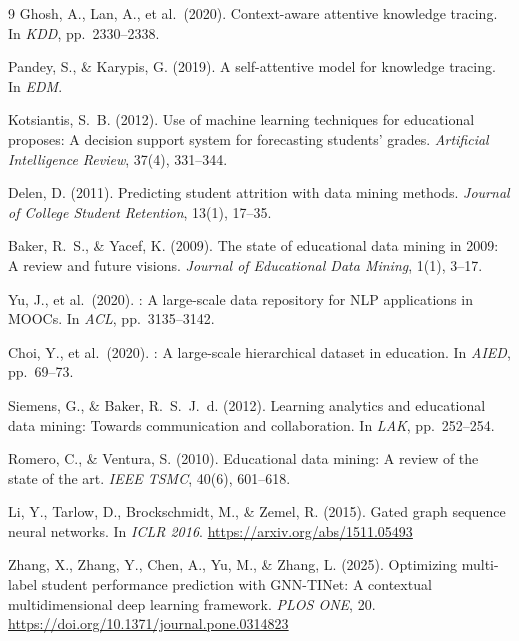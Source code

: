\documentclass[sigconf]{acmart}
\begin{document}
\begin{thebibliography}{9}
Ghosh, A., Lan, A., et al.\ (2020).
\newblock Context-aware attentive knowledge tracing.
\newblock In \emph{KDD}, pp.\ 2330--2338.

Pandey, S., \& Karypis, G. (2019).
\newblock A self-attentive model for knowledge
  tracing.
\newblock In \emph{EDM}.

Kotsiantis, S.~B. (2012).
\newblock Use of machine learning techniques for
  educational proposes: A decision support system
  for forecasting students' grades.
\newblock \emph{Artificial Intelligence Review},
  37(4), 331--344.

Delen, D. (2011).
\newblock Predicting student attrition with data
  mining methods.
\newblock \emph{Journal of College Student
  Retention}, 13(1), 17--35.

Baker, R.~S., \& Yacef, K. (2009).
\newblock The state of educational data mining in
  2009: A review and future visions.
\newblock \emph{Journal of Educational Data Mining},
  1(1), 3--17.

Yu, J., et al.\ (2020).
: A large-scale data repository
  for {NLP} applications in {MOOCs}.
\newblock In \emph{ACL}, pp.\ 3135--3142.

Choi, Y., et al.\ (2020).
: A large-scale hierarchical dataset
  in education.
\newblock In \emph{AIED}, pp.\ 69--73.

Siemens, G., \& Baker, R.~S.~J.~d. (2012).
\newblock Learning analytics and educational data
  mining: Towards communication and collaboration.
\newblock In \emph{LAK}, pp.\ 252--254.

Romero, C., \& Ventura, S. (2010).
\newblock Educational data mining: A review of the
  state of the art.
\newblock \emph{IEEE TSMC}, 40(6), 601--618.

Li, Y., Tarlow, D., Brockschmidt, M., \& Zemel, R. (2015).
\newblock Gated graph sequence neural networks.
\newblock In \emph{ICLR 2016}.
\newblock \url{https://arxiv.org/abs/1511.05493}

Zhang, X., Zhang, Y., Chen, A., Yu, M., \& Zhang, L. (2025).
\newblock Optimizing multi-label student performance prediction with
  {GNN-TINet}: A contextual multidimensional deep learning framework.
\newblock \emph{PLOS ONE}, 20.
\newblock \url{https://doi.org/10.1371/journal.pone.0314823}


\end{thebibliography}
\end{document}
